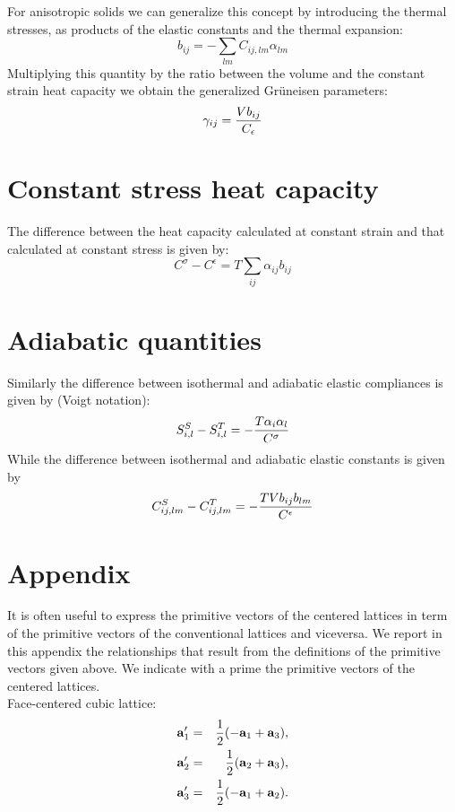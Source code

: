 \documentclass[12pt,a4paper]{article}
\begin{document}
For anisotropic solids we can generalize this concept by introducing
the thermal stresses, as products of the elastic constants and the
thermal expansion:
\begin{equation}
b_{ij} = -\sum_{lm} C_{ij,lm} \alpha_{lm}
\end{equation}
Multiplying this quantity by the ratio between the volume and the
constant strain heat capacity we obtain the generalized Gr\"uneisen
parameters:
\begin{equation}
\gamma_{ij} =  {V b_{ij} \over C_\epsilon}
\end{equation}

\newpage
\section{\color{coral}Constant stress heat capacity}

The difference between the heat capacity calculated at constant strain 
and that calculated at constant stress is given by:
\begin{equation}
C^\sigma - C^\epsilon = T \sum_{ij} \alpha_{ij} b_{ij}
\end{equation}

\newpage
\section{\color{coral}Adiabatic quantities}

Similarly the difference between isothermal and adiabatic
elastic compliances is given by (Voigt notation):
\begin{equation}
S^S_{i,l} - S^T_{i,l} = - {T \alpha_{i} \alpha_{l} \over C^\sigma}
\end{equation}
While the difference between isothermal and adiabatic elastic constants
is given by
\begin{equation}
C^S_{ij,lm} - C^T_{ij,lm} = - {T V b_{ij} b_{lm} \over C^\epsilon}
\end{equation}

\newpage
\section{\color{coral}Appendix}
It is often useful to express the primitive vectors of the centered
lattices in term of the primitive vectors of the conventional lattices
and viceversa. We report in this appendix the relationships that result
from the definitions of the primitive vectors given above.
We indicate with a prime the primitive vectors of the centered lattices. \\
Face-centered cubic lattice:
\begin{eqnarray}
{\bf a}_1'&=&{1\over 2} (-{\bf a}_1 + {\bf a}_3), \\
{\bf a}_2'&=&{1\over 2} ({\bf a}_2 + {\bf a}_3), \\
{\bf a}_3'&=&{1\over 2} (-{\bf a}_1 + {\bf a}_2). 
\end{eqnarray}
\end{document}
